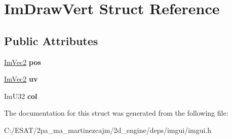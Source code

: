 \hypertarget{struct_im_draw_vert}{}\section{Im\+Draw\+Vert Struct Reference}
\label{struct_im_draw_vert}
\subsection*{Public Attributes}
\begin{DoxyCompactItemize}
\item 
\mbox{\label{struct_im_draw_vert_aedc578bbf364ddea71be12b4f177a5b4}} 
\hyperlink{struct_im_vec2}{Im\+Vec2} {\bfseries pos}
\item 
\mbox{\label{struct_im_draw_vert_abdf3183529055a6c3f709b23a4bf06b1}} 
\hyperlink{struct_im_vec2}{Im\+Vec2} {\bfseries uv}
\item 
\mbox{\label{struct_im_draw_vert_ab98ba53ce2690b56f5ba94682ed83940}} 
Im\+U32 {\bfseries col}
\end{DoxyCompactItemize}


The documentation for this struct was generated from the following file\+:\begin{DoxyCompactItemize}
\item 
C\+:/\+E\+S\+A\+T/2pa\+\_\+ma\+\_\+martinezcajm/2d\+\_\+engine/deps/imgui/imgui.\+h\end{DoxyCompactItemize}
